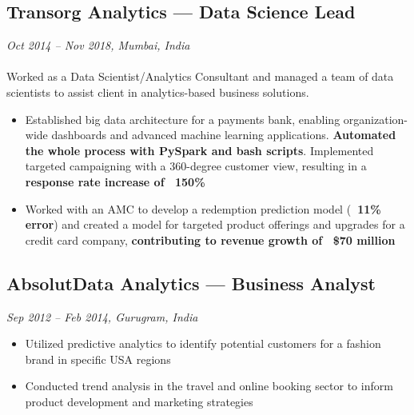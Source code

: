 \documentclass[a4paper,10pt]{article}
\begin{document}
\subsection*{Transorg Analytics — Data Science Lead}
\textit{Oct 2014 – Nov 2018, Mumbai, India}
\\
\\
Worked as a Data Scientist/Analytics Consultant and managed a team of data scientists to assist client in analytics-based business solutions.
\begin{itemize}
    \item Established big data architecture for a payments bank, enabling organization-wide dashboards and advanced machine learning applications. \textbf{Automated the whole process with PySpark and bash scripts}. Implemented targeted campaigning with a 360-degree customer view, resulting in a \textbf{response rate increase of ~150\%}
    \item Worked with an AMC to develop a redemption prediction model (\textbf{~11\% error}) and created a model for targeted product offerings and upgrades for a credit card company, \textbf{contributing to revenue growth of ~\$70 million}
\end{itemize}

\subsection*{AbsolutData Analytics — Business Analyst} 
\textit{Sep 2012 – Feb 2014, Gurugram, India}
\\
\begin{itemize}
    \item Utilized predictive analytics to identify potential customers for a fashion brand in specific USA regions
    \item Conducted trend analysis in the travel and online booking sector to inform product development and marketing strategies
\end{itemize}
\end{document}

